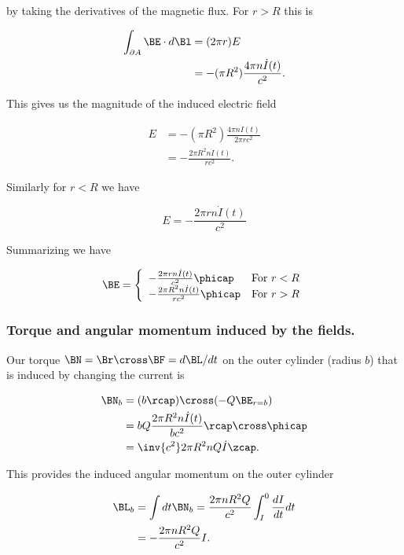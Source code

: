 by taking the derivatives of the magnetic flux.  For $r > R$ this is

\begin{align*}
\int_{\partial A} \BE \cdot d\Bl
&= (2 \pi r) E \\
&=
-(\pi R^2) \frac{4 \pi n \dot{I}(t)}{c^2}.
\end{align*}

This gives us the magnitude of the induced electric field

\begin{align*}
E
&= -(\pi R^2) \frac{4 \pi n \dot{I}(t)}{2 \pi r c^2} \\
&= -\frac{2 \pi R^2 n \dot{I}(t)}{r c^2}.
\end{align*}

Similarly for $r < R$ we have

\begin{equation}\label{eqn:relativisticElectrodynamicsT5:293}
E = -\frac{2 \pi r n \dot{I}(t)}{c^2}
\end{equation}

Summarizing we have

\begin{equation}\label{eqn:relativisticElectrodynamicsT5:310}
\BE =
\left\{
\begin{array}{l l}
-\frac{2 \pi r n \dot{I}(t)}{c^2} \phicap 		& \mbox{For $r < R$} \\
-\frac{2 \pi R^2 n \dot{I}(t)}{r c^2} \phicap 		& \mbox{For $r > R$}
\end{array}
\right.
\end{equation}

\subsubsection{Torque and angular momentum induced by the fields.}

Our torque $\BN = \Br \cross \BF = d\BL/dt$ on the outer cylinder (radius $b$) that is induced by changing the current is

\begin{align*}
\BN_b
&= (b \rcap) \cross (-Q \BE_{r = b}) \\
&= b Q \frac{2 \pi R^2 n \dot{I}(t)}{b c^2} \rcap \cross \phicap \\
&= \inv{c^2} 2 \pi R^2 n Q \dot{I} \zcap.
\end{align*}

This provides the induced angular momentum on the outer cylinder

\begin{align*}
\BL_b
&= \int dt \BN_b = \frac{ 2 \pi n R^2 Q}{c^2} \int_I^0 \frac{dI}{dt} dt \\
&= -\frac{2 \pi n R^2 Q}{c^2} I.
\end{align*}

